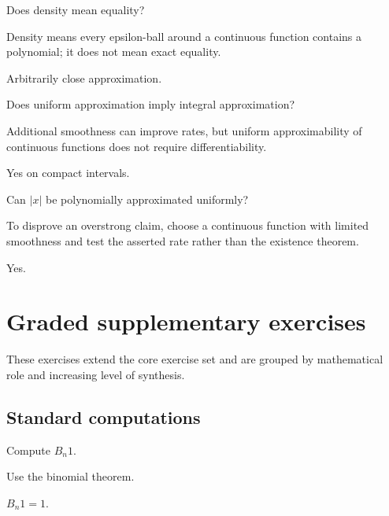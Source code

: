 \begin{exercise}\label{exr:ii21-06}
Does density mean equality?
\end{exercise}
\begin{hint}
Density means every epsilon-ball around a continuous function contains a polynomial; it does not mean exact equality.
\end{hint}
\begin{solution}
Arbitrarily close approximation.
\end{solution}

\begin{exercise}\label{exr:ii21-07}
Does uniform approximation imply integral approximation?
\end{exercise}
\begin{hint}
Additional smoothness can improve rates, but uniform approximability of continuous functions does not require differentiability.
\end{hint}
\begin{solution}
Yes on compact intervals.
\end{solution}

\begin{exercise}\label{exr:ii21-08}
Can $|x|$ be polynomially approximated uniformly?
\end{exercise}
\begin{hint}
To disprove an overstrong claim, choose a continuous function with limited smoothness and test the asserted rate rather than the existence theorem.
\end{hint}
\begin{solution}
Yes.
\end{solution}


\section{Graded supplementary exercises}
These exercises extend the core exercise set and are grouped by mathematical role and increasing level of synthesis.

\subsection*{Standard computations}

\begin{exercise}\label{exr:ii21-expand-01}
Compute \(B_n1\).
\end{exercise}
\begin{hint}
Use the binomial theorem.
\end{hint}
\begin{solution}
\(B_n1=1\).
\end{solution}

